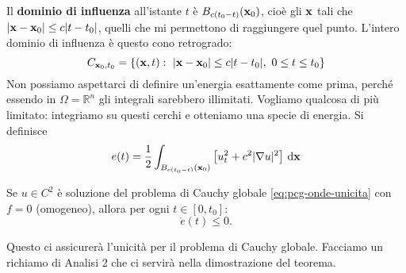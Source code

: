 Il \textbf{dominio di influenza} all'istante $t$ è $B_{c(t_{0} -t)}(\mathbf{x}_{0})$, cioè gli $\mathbf{x}$ tali che $| \mathbf{x} -\mathbf{x}_{0}| \leq c| t-t_{0}| $, quelli che mi permettono di raggiungere quel punto. L'intero dominio di influenza è questo cono retrogrado:
\begin{equation}
    C_{\mathbf{x}_{0} ,t_{0}} =\{(\mathbf{x} ,t) :\ | \mathbf{x} -\mathbf{x}_{0}| \leq c| t-t_{0}| ,\ 0\leq t\leq t_{0}\}
\end{equation}
Non possiamo aspettarci di definire un'energia esattamente come prima, perché essendo in $\Omega =\mathbb{R}^{n}$ gli integrali sarebbero illimitati. Vogliamo qualcosa di più limitato: integriamo su questi cerchi e otteniamo una specie di energia. Si definisce
\begin{equation}
    e(t) =\frac{1}{2}\int _{B_{c(t_{0} -t)}(\mathbf{x}_{0})}\left[ u_{t}^{2} +c^{2}| \nabla u| ^{2}\right] \,\mathrm d \mathbf{x}
    \label{eq:onde-energia-pcg}
\end{equation}
\begin{theorem}
    Se $u\in C^{2}$ è soluzione del problema di Cauchy globale \eqref{eq:pcg-onde-unicita} con $f=0$ (omogeneo), allora per ogni $t\in [ 0,t_{0}]$:
    \begin{equation}
        \dot{e}(t) \leq 0.
    \end{equation}
\end{theorem}
Questo ci assicurerà l'unicità per il problema di Cauchy globale.
Facciamo un richiamo di Analisi 2 che ci servirà nella dimostrazione del teorema.
